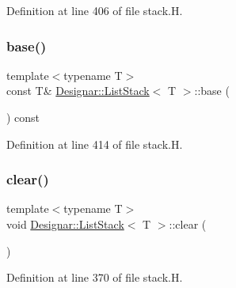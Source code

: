 Definition at line 406 of file stack.\+H.

\mbox{\label{class_designar_1_1_list_stack_a98ea1c6dff17d53b810e6fedae85340c}} 
\subsubsection{\texorpdfstring{base()}{base()}\hspace{0.1cm}{\footnotesize\ttfamily [2/2]}}
{\footnotesize\ttfamily template$<$typename T$>$ \\
const T\& \hyperlink{class_designar_1_1_list_stack}{Designar\+::\+List\+Stack}$<$ T $>$\+::base (\begin{DoxyParamCaption}{ }\end{DoxyParamCaption}) const\hspace{0.3cm}{\ttfamily [inline]}}



Definition at line 414 of file stack.\+H.

\mbox{\label{class_designar_1_1_list_stack_aef07f86ff93ad1742207df436ba71aaa}} 
\subsubsection{\texorpdfstring{clear()}{clear()}}
{\footnotesize\ttfamily template$<$typename T$>$ \\
void \hyperlink{class_designar_1_1_list_stack}{Designar\+::\+List\+Stack}$<$ T $>$\+::clear (\begin{DoxyParamCaption}{ }\end{DoxyParamCaption})\hspace{0.3cm}{\ttfamily [inline]}}



Definition at line 370 of file stack.\+H.

\mbox{\label{class_designar_1_1_list_stack_a78ec42650d4028911a0054f6baaa673a}} 
